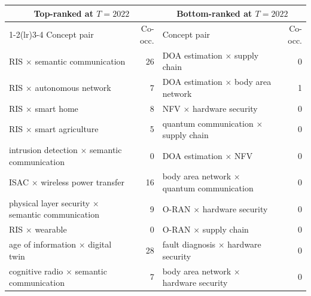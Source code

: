 \begin{tabular}{lr@{\hspace{12pt}}lr}
\toprule
\multicolumn{2}{c}{Top-ranked at $T{=}2022$} & \multicolumn{2}{c}{Bottom-ranked at $T{=}2022$}\\
\cmidrule(lr){1-2}\cmidrule(lr){3-4}
Concept pair & Co-occ. & Concept pair & Co-occ.\\
\midrule
RIS $\times$ semantic communication & 26 & DOA estimation $\times$ supply chain & 0\\
RIS $\times$ autonomous network & 7 & DOA estimation $\times$ body area network & 1\\
RIS $\times$ smart home & 8 & NFV $\times$ hardware security & 0\\
RIS $\times$ smart agriculture & 5 & quantum communication $\times$ supply chain & 0\\
intrusion detection $\times$ semantic communication & 0 & DOA estimation $\times$ NFV & 0\\
ISAC $\times$ wireless power transfer & 16 & body area network $\times$ quantum communication & 0\\
physical layer security $\times$ semantic communication & 9 & O-RAN $\times$ hardware security & 0\\
RIS $\times$ wearable & 0 & O-RAN $\times$ supply chain & 0\\
age of information $\times$ digital twin & 28 & fault diagnosis $\times$ hardware security & 0\\
cognitive radio $\times$ semantic communication & 7 & body area network $\times$ hardware security & 0\\
\bottomrule
\end{tabular}